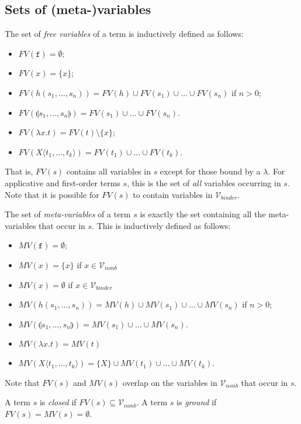 \documentclass{lmcs}
\theoremstyle{theorem}\newtheorem{theorem}{Theorem}
\theoremstyle{theorem}\newtheorem{lemma}[theorem]{Lemma}
\theoremstyle{theorem}\newtheorem{corollary}[theorem]{Corollary}
\theoremstyle{definition}\newtheorem{definition}[theorem]{Definition}
\theoremstyle{definition}\newtheorem{example}[theorem]{Example}
\newcommand{\Vfree}{\mathcal{V}_{\mathit{nonb}}}
\newcommand{\Vbound}{\mathcal{V}_{\mathit{binder}}}
\newcommand{\FV}{\mathit{FV}}
\newcommand{\FMV}{\mathit{MV}}
\newcommand{\identifier}[1]{\mathtt{#1}}
\newcommand{\afun}{\identifier{f}}
\newcommand{\avar}{x}
\newcommand{\Avar}{X}
\newcommand{\abs}[2]{\lambda #1.#2}
\newcommand{\meta}[2]{#1\langle#2\rangle}
\newcommand{\tuple}[2]{\llparenthesis #1,\dots,#2 \rrparenthesis}
\begin{document}
\subsection{Sets of (meta-)variables}
The set of \emph{free variables} of a term is inductively defined as follows:
\begin{itemize}
\item $\FV(\afun) = \emptyset$;
\item $\FV(\avar) = \{ \avar \}$;
\item $\FV(h(s_1,\dots,s_n)) = \FV(h) \cup \FV(s_1) \cup \dots \cup \FV(s_n)$ if
  $n > 0$;
\item $\FV(\tuple{s_1}{s_n}) = \FV(s_1) \cup \dots \cup \FV(s_n)$.
\item $\FV(\abs{\avar}{t}) = \FV(t) \setminus \{ \avar \}$;
\item $\FV(\meta{\Avar}{t_1,\dots,t_k}) = \FV(t_1) \cup \dots \cup \FV(t_k)$.
\end{itemize}
That is, $\FV(s)$ contains all variables in $s$ except for those bound by a
$\lambda$.
For applicative and first-order terms $s$, this is the set of \emph{all}
variables occurring in $s$.
Note that it is possible for $\FV(s)$ to contain variables in $\Vbound$.

The set of \emph{meta-variables} of a term $s$ is exactly the set containing all
the meta-variables that occur in $s$.  This is inductively defined as follows:
\begin{itemize}
\item $\FMV(\afun) = \emptyset$;
\item $\FMV(\avar) = \{ \avar \}$ if $\avar \in \Vfree$
\item $\FMV(\avar) = \emptyset$ if $\avar \in \Vbound$
\item $\FMV(h(s_1,\dots,s_n)) = \FMV(h) \cup \FMV(s_1) \cup \dots \cup
  \FMV(s_n)$ if $n > 0$;
\item $\FMV(\tuple{s_1}{s_n}) = \FMV(s_1) \cup \dots \cup \FMV(s_n)$.
\item $\FMV(\abs{\avar}{t}) = \FMV(t)$
\item $\FMV(\meta{\Avar}{t_1,\dots,t_k}) = \{ \Avar \} \cup \FMV(t_1) \cup
  \dots \cup \FMV(t_k)$.
\end{itemize}

Note that $\FV(s)$ and $\FMV(s)$ overlap on the variables in $\Vfree$ that occur
in $s$.

A term $s$ is \emph{closed} if $\FV(s) \subseteq \Vfree$.
A term $s$ is \emph{ground} if $\FV(s) = \FMV(s) = \emptyset$.
\end{document}
